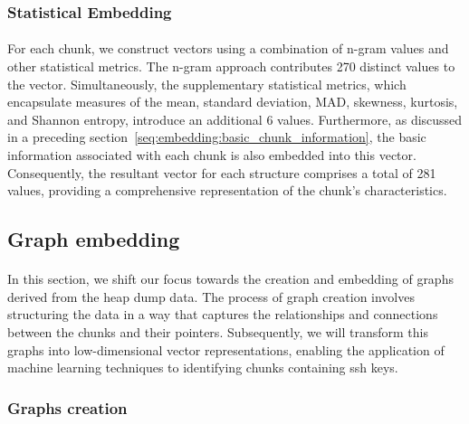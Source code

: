     \subsubsection{Statistical Embedding}

        \paragraph{}For each \gls{chunk}, we construct vectors using a combination of n-gram values and other statistical metrics. The n-gram approach contributes 270 distinct values to the vector. Simultaneously, the supplementary statistical metrics, which encapsulate measures of the mean, standard deviation, MAD, skewness, kurtosis, and Shannon entropy, introduce an additional 6 values. Furthermore, as discussed in a preceding section~\ref{seq:embedding:basic_chunk_information}, the basic information associated with each chunk is also embedded into this vector. Consequently, the resultant vector for each structure comprises a total of 281 values, providing a comprehensive representation of the chunk's characteristics.
    
    

\subsection{Graph embedding}\label{sec:embedding:graph_embedding}
    \paragraph{}In this section, we shift our focus towards the creation and embedding of graphs derived from the heap dump data. The process of graph creation involves structuring the data in a way that captures the relationships and connections between the \glspl{chunk} and their \glspl{pointer}. Subsequently, we will transform this graphs into low-dimensional vector representations, enabling the application of machine learning techniques to identifying \glspl{chunk} containing ssh keys.

    \subsubsection{Graphs creation}
